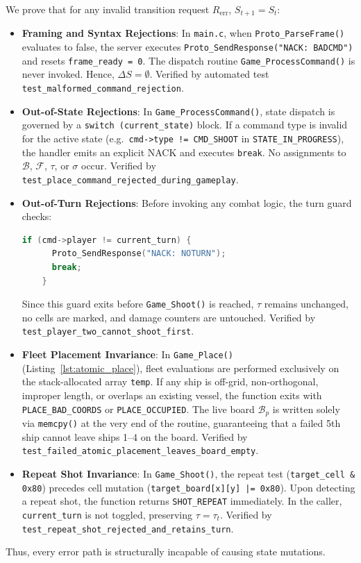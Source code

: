 We prove that for any invalid transition request $R_{\text{err}}$, $S_{t+1} = S_t$:
\begin{itemize}
    \item \textbf{Framing and Syntax Rejections}: In \texttt{main.c}, when \texttt{Proto\_ParseFrame()} evaluates to false, the server executes \texttt{Proto\_SendResponse("NACK: BADCMD")} and resets \texttt{frame\_ready = 0}. The dispatch routine \texttt{Game\_ProcessCommand()} is never invoked. Hence, $\Delta S = \emptyset$. Verified by automated test \texttt{test\_malformed\_command\_rejection}.
    \item \textbf{Out-of-State Rejections}: In \texttt{Game\_ProcessCommand()}, state dispatch is governed by a \texttt{switch (current\_state)} block. If a command type is invalid for the active state (e.g.\ \texttt{cmd->type != CMD\_SHOOT} in \texttt{STATE\_IN\_PROGRESS}), the handler emits an explicit NACK and executes \texttt{break}. No assignments to $\mathcal{B}$, $\mathcal{F}$, $\tau$, or $\sigma$ occur. Verified by \texttt{test\_place\_command\_rejected\_during\_gameplay}.
    \item \textbf{Out-of-Turn Rejections}: Before invoking any combat logic, the turn guard checks:
    \begin{lstlisting}[language=C]
    if (cmd->player != current_turn) {
      Proto_SendResponse("NACK: NOTURN");
      break;
    }
    \end{lstlisting}
    Since this guard exits before \texttt{Game\_Shoot()} is reached, $\tau$ remains unchanged, no cells are marked, and damage counters are untouched. Verified by \texttt{test\_player\_two\_cannot\_shoot\_first}.
    \item \textbf{Fleet Placement Invariance}: In \texttt{Game\_Place()} (Listing~\ref{lst:atomic_place}), fleet evaluations are performed exclusively on the stack-allocated array \texttt{temp}. If any ship is off-grid, non-orthogonal, improper length, or overlaps an existing vessel, the function exits with \texttt{PLACE\_BAD\_COORDS} or \texttt{PLACE\_OCCUPIED}. The live board $\mathcal{B}_p$ is written solely via \texttt{memcpy()} at the very end of the routine, guaranteeing that a failed 5th ship cannot leave ships 1--4 on the board. Verified by \texttt{test\_failed\_atomic\_placement\_leaves\_board\_empty}.
    \item \textbf{Repeat Shot Invariance}: In \texttt{Game\_Shoot()}, the repeat test (\texttt{target\_cell \& 0x80}) precedes cell mutation (\texttt{target\_board[x][y] |= 0x80}). Upon detecting a repeat shot, the function returns \texttt{SHOT\_REPEAT} immediately. In the caller, \texttt{current\_turn} is not toggled, preserving $\tau = \tau_t$. Verified by \texttt{test\_repeat\_shot\_rejected\_and\_retains\_turn}.
\end{itemize}
Thus, every error path is structurally incapable of causing state mutations.

